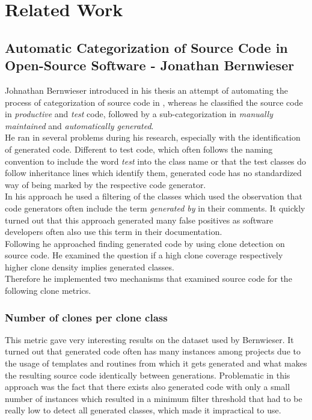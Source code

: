 
\chapter{Related Work}\label{chapter:related}

\section{Automatic Categorization of Source Code in Open-Source Software - Jonathan Bernwieser}

Johnathan Bernwieser introduced in his thesis an attempt of automating the process of categorization of source code in \cite{Bernwieser2014}, whereas he classified the source code in \textit{productive} and \textit{test} code, followed by a sub-categorization in \textit{manually maintained} and \textit{automatically generated}.\\
He ran in several problems during his research, especially with the identification of generated code. Different to test code, which often follows the naming convention to include the word \textit{test} into the class name or that the test classes do follow inheritance lines which identify them, generated code has no standardized way of being marked by the respective code generator.\\
In his approach he used a filtering of the classes which used the observation that code generators often include the term \textit{generated by} in their comments. It quickly turned out that this approach generated many false positives as software developers often also use this term in their documentation.\\
Following he approached finding generated code by using clone detection on source code. He examined the question if a high clone coverage respectively higher clone density implies generated classes.\\
Therefore he implemented two mechanisms that examined source code for the following clone metrics.
\subsection{Number of clones per clone class}
This metric gave very interesting results on the dataset used by Bernwieser. It turned out that generated code often has many instances among projects due to the usage of templates and routines from which it gets generated and what makes the resulting source code identically between generations. Problematic in this approach was the fact that there exists also generated code with only a small number of instances which resulted in a minimum filter threshold that had to be really low to detect all generated classes, which made it impractical to use.
